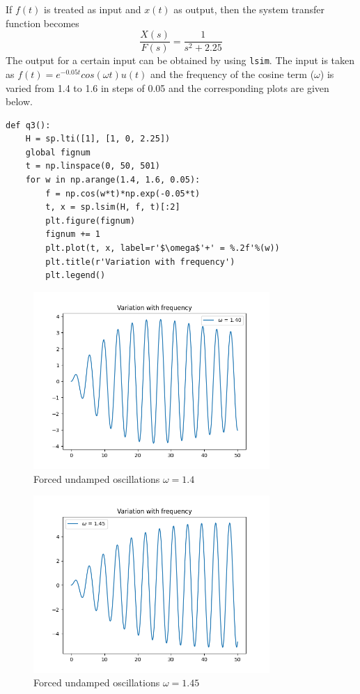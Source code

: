 \documentclass[12pt, a4paper]{article}
\begin{document}
If $f(t)$ is treated as input and $x(t)$ as output, then the system transfer function becomes
\begin{equation*}
\frac{X(s)}{F(s)} = \frac{1}{s^2 + 2.25}
\end{equation*}
The output for a certain input can be obtained by using \texttt{lsim}. The input is taken as $f(t) = e^{-0.05t}cos(\omega t)u(t)$ and the frequency of the cosine term ($\omega$) is varied from 1.4 to 1.6 in steps of 0.05 and the corresponding plots are given below.
\begin{lstlisting}
def q3():
    H = sp.lti([1], [1, 0, 2.25])
    global fignum
    t = np.linspace(0, 50, 501)
    for w in np.arange(1.4, 1.6, 0.05):
        f = np.cos(w*t)*np.exp(-0.05*t)
        t, x = sp.lsim(H, f, t)[:2]
        plt.figure(fignum)
        fignum += 1
        plt.plot(t, x, label=r'$\omega$'+' = %.2f'%(w))
        plt.title(r'Variation with frequency')
        plt.legend()
\end{lstlisting}
\begin{figure}[H]
\centering
\includegraphics[width=0.8\textwidth]{Figure_3.png}
\caption{Forced undamped oscillations $\omega = 1.4$}
\end{figure}
\begin{figure}[H]
\centering
\includegraphics[width=0.8\textwidth]{Figure_4.png}
\caption{Forced undamped oscillations $\omega = 1.45$}
\end{figure}
\end{document}
